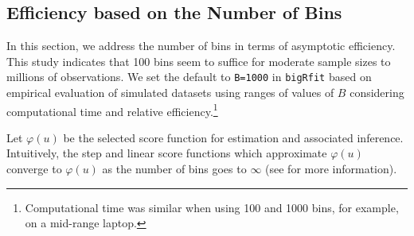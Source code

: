 \subsection{Efficiency based on the Number of Bins}
\label{sect:effstudy}
In this section, we address the number of bins in terms of asymptotic efficiency.
This study indicates that 100 bins seem to suffice for moderate sample sizes to millions of observations.
We set the default to \verb|B=1000| in \verb|bigRfit| based on empirical evaluation of simulated datasets using ranges of values of $B$ considering computational time and relative efficiency.\footnote{Computational time was similar when using 100 and 1000 bins, for example, on a mid-range laptop.}

Let $\varphi(u)$ be the selected score function for estimation and associated inference.
Intuitively, the step and linear score functions which approximate $\varphi(u)$
converge to $\varphi(u)$ as the number of bins goes to $\infty$
(see \citet{bigRfitpaper} for more information).


%
%

